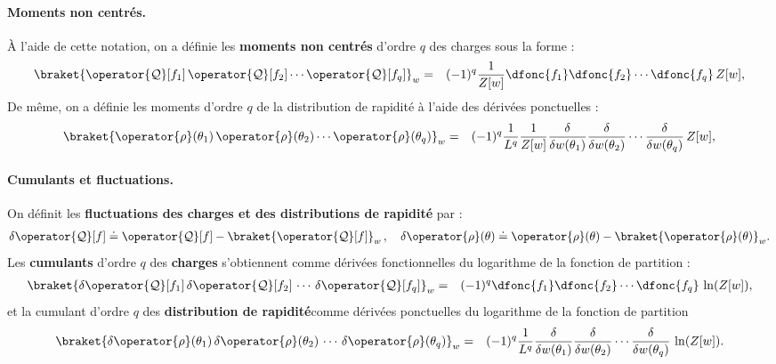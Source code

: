 \medskip

\paragraph{Moments non centrés.}
À l’aide de cette notation, on a définie les {\bf moments non centrés} d’ordre $q$ des charges sous la forme :
\begin{eqnarray}\label{chap4:eq.moment.charge.q.1}
	\braket{\operator{\mathcal{Q}}[f_1] \,  \operator{\mathcal{Q}}[f_2] \cdots \operator{\mathcal{Q}}[f_q]}_w  & = & (-1)^q \frac{1}{Z[w]}\dfonc{f_1} \dfonc{f_2} \cdots \dfonc{f_q}\,  Z[w], 	
\end{eqnarray}
De même, on a définie les moments d’ordre $q$ de la distribution de rapidité à l’aide des dérivées  ponctuelles :
\begin{eqnarray}\label{chap4:eq.moment.distr.q.1}
	\braket{\operator{\rho}(\theta_1) \,  \operator{\rho}(\theta_2) \cdots \operator{\rho}(\theta_q)}_w  & = & (-1)^q \frac{1}{L^q}\frac{1}{Z[w]}\frac{\delta}{\delta w(\theta_1)} \frac{\delta}{\delta w(\theta_2)} \cdots \frac{\delta}{\delta w(\theta_q)}\,  Z[w], 	
\end{eqnarray}

\paragraph{Cumulants et fluctuations.}
On définit les {\bf fluctuations des charges et des distributions de rapidité} par : 
\begin{eqnarray}
	\delta \operator{\mathcal{Q}}[f]	 \doteq \operator{\mathcal{Q}}[f] - \braket{\operator{\mathcal{Q}}[f]}_w \, ,  \quad \delta \operator{\rho}(\theta)	 \doteq \operator{\rho}(\theta) - \braket{\operator{\rho}(\theta)}_w.
\end{eqnarray}
Les {\bf cumulants} d’ordre $q$ des {\bf charges} s’obtiennent comme dérivées fonctionnelles du logarithme de la fonction de partition :
\begin{eqnarray}\label{chap4:eq.cumulant.charge.q.1}
	\braket{\delta\operator{\mathcal{Q}}[f_1] \, \delta\operator{\mathcal{Q}}[f_2] \, \cdots \,  \delta\operator{\mathcal{Q}}[f_q]}_w  & = & (-1)^q \dfonc{f_1} \dfonc{f_2} \cdots \dfonc{f_q}\,  \ln(Z[w]), 	
\end{eqnarray}
et la cumulant d'ordre $q$ des {\bf distribution de rapidité}comme dérivées ponctuelles du logarithme de la fonction de partition 
\begin{eqnarray}\label{chap4:eq.cumulant.distr.q.1}
	\braket{\delta \operator{\rho}(\theta_1) \, \delta\operator{\rho}(\theta_2) \, \cdots \,  \delta\operator{\rho}(\theta_q)}_w  & = & (-1)^q \frac{1}{L^q} \frac{\delta}{\delta w(\theta_1)} \frac{\delta}{\delta w(\theta_2)} \cdots \frac{\delta}{\delta w(\theta_q)}\,  \ln (Z[w]). 	
\end{eqnarray}

